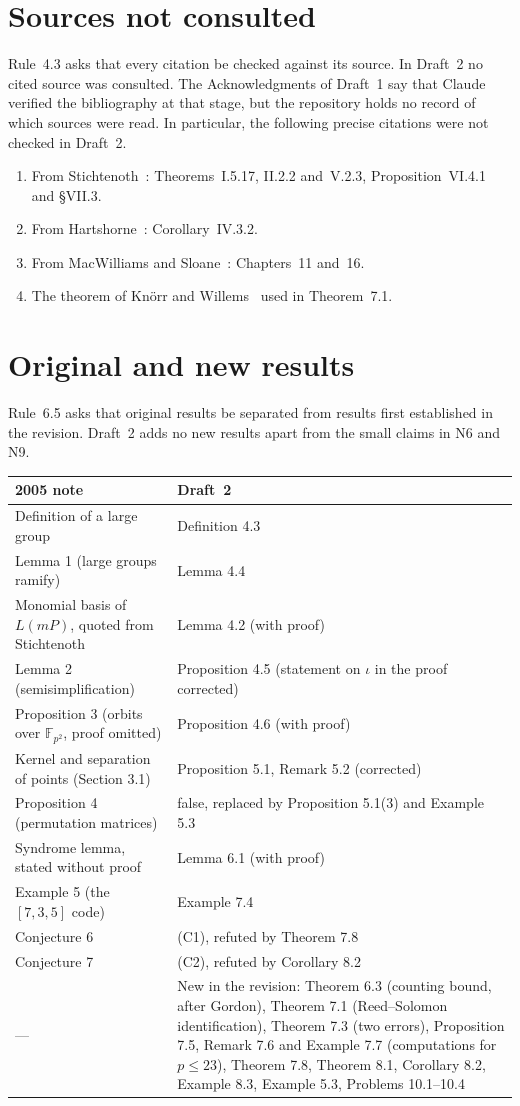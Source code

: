 \documentclass[12pt,letterpaper]{article}
\newcommand{\F}{\mathbb{F}}
\begin{document}
\section{Sources not consulted}\label{sec:notconsulted}
Rule~4.3 asks that every citation be checked against its source. In Draft~2 no
cited source was consulted. The Acknowledgments of Draft~1 say that Claude
verified the bibliography at that stage, but the repository holds no record of
which sources were read. In particular, the following precise citations were not
checked in Draft~2.
\begin{enumerate}
\item From Stichtenoth~\cite{St93}: Theorems~I.5.17, II.2.2 and~V.2.3,
Proposition~VI.4.1 and \S VII.3.
\item From Hartshorne~\cite{Ha77}: Corollary~IV.3.2.
\item From MacWilliams and Sloane~\cite{MS77}: Chapters~11 and~16.
\item The theorem of Kn\"orr and Willems~\cite{KW90} used in Theorem~7.1.
\end{enumerate}

\section{Original and new results}\label{sec:map}
Rule~6.5 asks that original results be separated from results first established
in the revision. Draft~2 adds no new results apart from the small claims in N6
and N9.
\begin{longtable}{@{}p{}p{}@{}}
\toprule
2005 note & Draft~2\\
\midrule\endhead
Definition of a large group & Definition 4.3\\
Lemma 1 (large groups ramify) & Lemma 4.4\\
Monomial basis of $L(mP)$, quoted from Stichtenoth & Lemma 4.2 (with proof)\\
Lemma 2 (semisimplification) & Proposition 4.5 (statement on $\iota$ in the proof corrected)\\
Proposition 3 (orbits over $\F_{p^2}$, proof omitted) & Proposition 4.6 (with proof)\\
Kernel and separation of points (Section 3.1) & Proposition 5.1, Remark 5.2 (corrected)\\
Proposition 4 (permutation matrices) & false, replaced by Proposition 5.1(3) and Example 5.3\\
Syndrome lemma, stated without proof & Lemma 6.1 (with proof)\\
Example 5 (the $[7,3,5]$ code) & Example 7.4\\
Conjecture 6 & (C1), refuted by Theorem 7.8\\
Conjecture 7 & (C2), refuted by Corollary 8.2\\
--- & New in the revision: Theorem 6.3 (counting bound, after Gordon),
Theorem 7.1 (Reed--Solomon identification), Theorem 7.3 (two errors),
Proposition 7.5, Remark 7.6 and Example 7.7 (computations for $p\le23$),
Theorem 7.8, Theorem 8.1, Corollary 8.2, Example 8.3, Example 5.3,
Problems 10.1--10.4\\
\bottomrule
\end{longtable}
\end{document}
